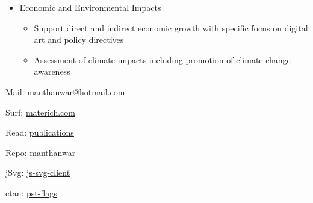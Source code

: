 \documentclass{ammTalk}
\begin{document}
\begin{itemize}[itemsep=5mm]

\item Economic and Environmental Impacts
\begin{itemize} \large
\item Support direct and indirect economic growth with specific focus on digital art and policy directives
\item Assessment of climate impacts including promotion of climate change awareness
\end{itemize}
\end{itemize}
\clearpage
\pagestyle{plain}
\begin{listII}
\large \ttfamily
\item Mail: \href{amailto:manthanwar@hotmail.com}{manthanwar@hotmail.com} %
\item Surf: \href{https://materich.onrender.com/}{materich.com}
\item Read: \href{https://materich.onrender.com//publications}{publications}
\item Repo: \href{https://github.com/manthanwar}{manthanwar}
\item jSvg: \href{https://www.npmjs.com/package/js-svg-client}{js-svg-client}
\item ctan: \href{https://ctan.org/pkg/pst-flags?lang=en}{pst-flags}
\end{listII}

\vspace{-5mm}
\setlength{\fboxsep}{4mm}
\hypersetup{urlcolor=teal!75}
\end{document}
